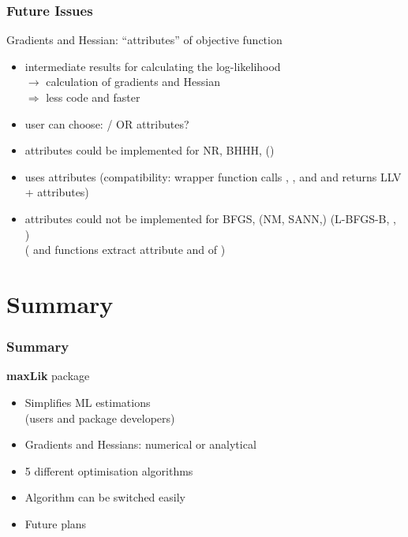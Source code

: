 \documentclass{beamer}
\begin{document}
\begin{frame}
\frametitle{Future Issues}
Gradients and Hessian: ``attributes'' of objective function
\begin{itemize}
\item intermediate results for calculating the log-likelihood\\
   $\rightarrow$ calculation of gradients and Hessian\\
   $\Rightarrow$ less code and faster
\item user can choose: / OR attributes?
\item attributes could be implemented for NR, BHHH, ()
\item {} uses attributes
   (compatibility: wrapper function calls , ,
   and  and returns LLV + attributes)
\item attributes could not be implemented for BFGS, (NM, SANN,)
   (L-BFGS-B, , )\\
   ( and  functions
   extract attribute  and 
   of )
\end{itemize}
\end{frame}


\section{Summary}
\begin{frame}
\frametitle{Summary}
\textbf{maxLik} package
\begin{itemize}
\item Simplifies ML estimations\\
   (users and package developers)
\item Gradients and Hessians: numerical or analytical
\item 5 different optimisation algorithms
\item Algorithm can be switched easily
\item Future plans
\end{itemize}
\end{frame}
\end{document}

